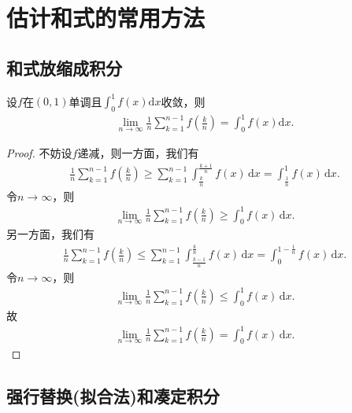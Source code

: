 \documentclass[../../main.tex]{subfiles}%
\begin{document}
\section{估计和式的常用方法}

\subsection{和式放缩成积分}

\begin{proposition}
设\(f\)在\((0,1)\)单调且\(\int_{0}^{1} f(x) \mathrm{d}x\)收敛，则
\begin{align*}
\lim_{n \to \infty} \frac{1}{n} \sum\limits_{k = 1}^{n - 1} f\left(\frac{k}{n}\right) = \int_{0}^{1} f(x)\mathrm{d}x.
\end{align*}
\end{proposition}
\begin{proof}
不妨设\(f\)递减，则一方面，我们有
\begin{align*}
\frac{1}{n}\sum\limits_{k=1}^{n-1}f\left(\frac{k}{n}\right) \geqslant \sum\limits_{k=1}^{n-1}\int_{\frac{k}{n}}^{\frac{k+1}{n}}f(x) \, \mathrm{d}x = \int_{\frac{1}{n}}^1 f(x) \, \mathrm{d}x.
\end{align*}
令\(n \to \infty\)，则
\begin{align*}
\lim_{n \to \infty} \frac{1}{n}\sum\limits_{k=1}^{n-1}f\left(\frac{k}{n}\right) \geqslant \int_0^1 f(x) \, \mathrm{d}x.
\end{align*}
另一方面，我们有
\begin{align*}
\frac{1}{n}\sum\limits_{k=1}^{n-1}f\left(\frac{k}{n}\right) \leqslant \sum\limits_{k=1}^{n-1}\int_{\frac{k-1}{n}}^{\frac{k}{n}}f(x) \, \mathrm{d}x = \int_{0}^{1-\frac{1}{n}} f(x) \, \mathrm{d}x.
\end{align*}
令\(n \to \infty\)，则
\begin{align*}
\lim_{n \to \infty} \frac{1}{n}\sum\limits_{k=1}^{n-1}f\left(\frac{k}{n}\right) \leqslant \int_0^1 f(x) \, \mathrm{d}x.
\end{align*}
故
\begin{align*}
\lim_{n \to \infty} \frac{1}{n}\sum\limits_{k=1}^{n-1}f\left(\frac{k}{n}\right) = \int_0^1 f(x) \, \mathrm{d}x.
\end{align*}
\end{proof}

\subsection{强行替换(拟合法)和凑定积分}\label{强行替换(拟合法)和凑定积分}
\end{document}
